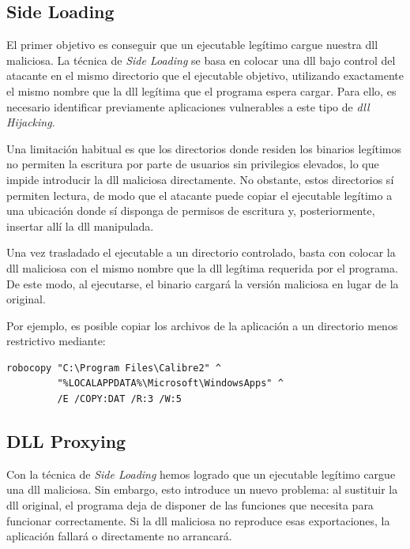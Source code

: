\subsection{Side Loading}

El primer objetivo es conseguir que un ejecutable legítimo cargue nuestra \acrshort{dll} maliciosa. La técnica de \textit{Side Loading} se basa en colocar una \acrshort{dll} bajo control del atacante en el mismo directorio que el ejecutable objetivo, utilizando exactamente el mismo nombre que la \acrshort{dll} legítima que el programa espera cargar. Para ello, es necesario identificar previamente aplicaciones vulnerables a este tipo de \textit{\acrshort{dll} Hijacking}.

Una limitación habitual es que los directorios donde residen los binarios legítimos no permiten la escritura por parte de usuarios sin privilegios elevados, lo que impide introducir la \acrshort{dll} maliciosa directamente. No obstante, estos directorios sí permiten lectura, de modo que el atacante puede copiar el ejecutable legítimo a una ubicación donde sí disponga de permisos de escritura y, posteriormente, insertar allí la \acrshort{dll} manipulada.

Una vez trasladado el ejecutable a un directorio controlado, basta con colocar la \acrshort{dll} maliciosa con el mismo nombre que la \acrshort{dll} legítima requerida por el programa. De este modo, al ejecutarse, el binario cargará la versión maliciosa en lugar de la original.

Por ejemplo, es posible copiar los archivos de la aplicación a un directorio menos restrictivo mediante:

\begin{verbatim}
robocopy "C:\Program Files\Calibre2" ^
         "%LOCALAPPDATA%\Microsoft\WindowsApps" ^
         /E /COPY:DAT /R:3 /W:5
\end{verbatim}


\subsection{DLL Proxying}

Con la técnica de \textit{Side Loading} hemos logrado que un ejecutable legítimo cargue una \acrshort{dll} maliciosa. Sin embargo, esto introduce un nuevo problema: al sustituir la \acrshort{dll} original, el programa deja de disponer de las funciones que necesita para funcionar correctamente. Si la \acrshort{dll} maliciosa no reproduce esas exportaciones, la aplicación fallará o directamente no arrancará.

